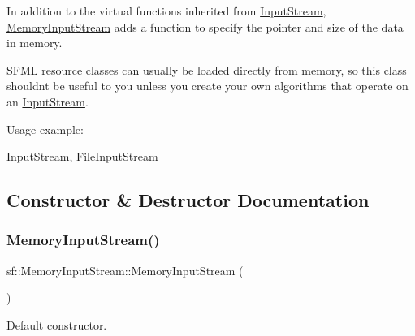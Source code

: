 In addition to the virtual functions inherited from \mbox{\hyperlink{classsf_1_1_input_stream}{Input\+Stream}}, \mbox{\hyperlink{classsf_1_1_memory_input_stream}{Memory\+Input\+Stream}} adds a function to specify the pointer and size of the data in memory.

S\+F\+ML resource classes can usually be loaded directly from memory, so this class shouldn\textquotesingle{}t be useful to you unless you create your own algorithms that operate on an \mbox{\hyperlink{classsf_1_1_input_stream}{Input\+Stream}}.

Usage example\+: 
\begin{DoxyCode}{0}
\DoxyCodeLine{}
\end{DoxyCode}


\mbox{\hyperlink{classsf_1_1_input_stream}{Input\+Stream}}, \mbox{\hyperlink{classsf_1_1_file_input_stream}{File\+Input\+Stream}} \begin{DoxyVerb}\end{DoxyVerb}
 

\subsection{Constructor \& Destructor Documentation}
\mbox{\label{classsf_1_1_memory_input_stream_a2d78851a69a8956a79872be41bcdfe0e}} 
\subsubsection{\texorpdfstring{MemoryInputStream()}{MemoryInputStream()}}
{\footnotesize\ttfamily sf\+::\+Memory\+Input\+Stream\+::\+Memory\+Input\+Stream (\begin{DoxyParamCaption}{ }\end{DoxyParamCaption})}



Default constructor. 

\begin{DoxyVerb}\end{DoxyVerb}
 

